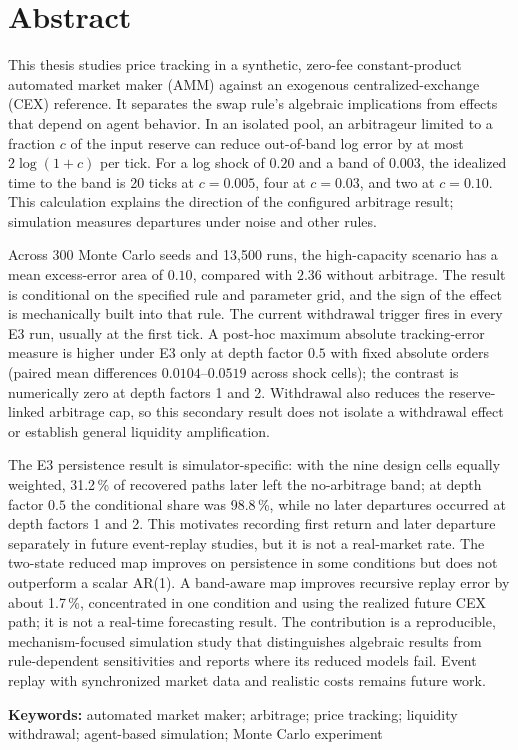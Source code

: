 \section{Abstract}

This thesis studies price tracking in a synthetic, zero-fee constant-product automated market maker (AMM) against an exogenous centralized-exchange (CEX) reference. It separates the swap rule's algebraic implications from effects that depend on agent behavior. In an isolated pool, an arbitrageur limited to a fraction $c$ of the input reserve can reduce out-of-band log error by at most $2\log(1+c)$ per tick. For a log shock of $0.20$ and a band of $0.003$, the idealized time to the band is 20 ticks at $c=0.005$, four at $c=0.03$, and two at $c=0.10$. This calculation explains the direction of the configured arbitrage result; simulation measures departures under noise and other rules.

Across 300 Monte Carlo seeds and 13,500 runs, the high-capacity scenario has a mean excess-error area of $0.10$, compared with $2.36$ without arbitrage. The result is conditional on the specified rule and parameter grid, and the sign of the effect is mechanically built into that rule. The current withdrawal trigger fires in every E3 run, usually at the first tick. A post-hoc maximum absolute tracking-error measure is higher under E3 only at depth factor $0.5$ with fixed absolute orders (paired mean differences $0.0104$--$0.0519$ across shock cells); the contrast is numerically zero at depth factors 1 and 2. Withdrawal also reduces the reserve-linked arbitrage cap, so this secondary result does not isolate a withdrawal effect or establish general liquidity amplification.

The E3 persistence result is simulator-specific: with the nine design cells equally weighted, 31.2\,\% of recovered paths later left the no-arbitrage band; at depth factor $0.5$ the conditional share was 98.8\,\%, while no later departures occurred at depth factors 1 and 2. This motivates recording first return and later departure separately in future event-replay studies, but it is not a real-market rate. The two-state reduced map improves on persistence in some conditions but does not outperform a scalar AR(1). A band-aware map improves recursive replay error by about 1.7\,\%, concentrated in one condition and using the realized future CEX path; it is not a real-time forecasting result. The contribution is a reproducible, mechanism-focused simulation study that distinguishes algebraic results from rule-dependent sensitivities and reports where its reduced models fail. Event replay with synchronized market data and realistic costs remains future work.

\textbf{Keywords:} automated market maker; arbitrage; price tracking; liquidity withdrawal; agent-based simulation; Monte Carlo experiment
